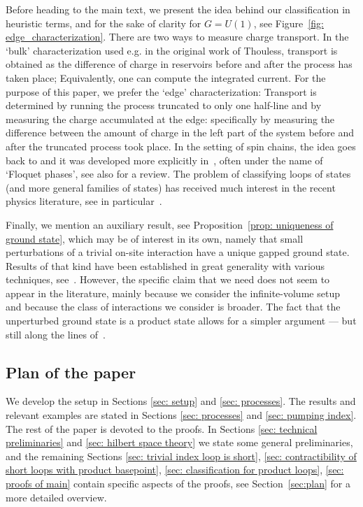 Before heading to the main text, we present the idea behind our classification in heuristic terms, and for the sake of clarity for $G=U(1)$, see Figure~\ref{fig: edge_characterization}. There are two ways to measure charge transport. In the `bulk' characterization used e.g. in the original work of Thouless, transport is obtained as the difference of charge in reservoirs before and after the process has taken place; Equivalently, one can compute the integrated current. For the purpose of this paper, we prefer the `edge' characterization: Transport is determined by running the process truncated to only one half-line and by measuring the charge accumulated at the edge: specifically by measuring the difference between the amount of charge in the left part of the system before and after the truncated process took place.  In the setting of spin chains, the idea goes back to \cite{KitaevConf} and it was developed more explicitly in~\cite{Else_2014,Else_2016,potter2016classification,von2016phase}, often under the name of `Floquet phases', see also \cite{Xiong_2018} for a review. The problem of classifying loops of states (and more general families of states) has received much interest in the recent physics literature, see in particular~\cite{KunoHatsugai,kapustin2022local,wen2021flow,Aasen_2022,shiozaki2022adiabatic}. 

Finally, we mention an auxiliary result, see Proposition~\ref{prop: uniqueness of ground state}, which may be of interest in its own, namely that small perturbations of a trivial on-site interaction have a unique gapped ground state. Results of that kind have been established in great generality with various techniques, see~\cite{yarotsky2006ground,bravyi2010topological,michalakis2013stability,nachtergaele2020quasi,del2021lie}. However, the specific claim that we need does not seem to appear in the literature, mainly because we consider the infinite-volume setup and because the class of interactions we consider is broader. The fact that the unperturbed ground state is a product state allows for a simpler argument --- but still along the lines of~\cite{michalakis2013stability}.

%
%
%
\subsection*{Plan of the paper} We develop the setup in Sections \ref{sec: setup} and \ref{sec: processes}. The results and relevant examples are stated in Sections \ref{sec: processes} and \ref{sec: pumping index}.  The rest of the paper is devoted to the proofs. In Sections \ref{sec: technical preliminaries} and \ref{sec: hilbert space theory} we state some general preliminaries, and the remaining Sections \ref{sec: trivial index loop is short}, \ref{sec: contractibility of short loops with product basepoint}, \ref{sec: classification for product loops}, \ref{sec: proofs of main} contain specific aspects of the proofs, see Section~\ref{sec:plan} for a more detailed overview.




